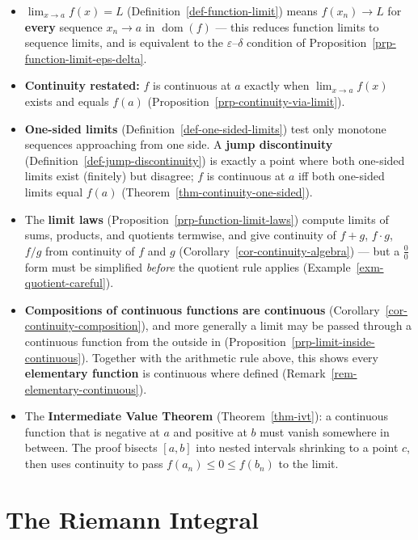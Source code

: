 \documentclass[
  letterpaper,
  DIV=11,
  numbers=noendperiod]{scrreprt}
\providecommand{\tightlist}{%
  \setlength{\itemsep}{0pt}\setlength{\parskip}{0pt}}
\theoremstyle{plain}
\theoremstyle{plain}
\theoremstyle{definition}
\theoremstyle{definition}
\theoremstyle{definition}
\theoremstyle{plain}
\theoremstyle{plain}
\theoremstyle{remark}
\begin{document}
\begin{itemize}
\tightlist
\item
  \(\displaystyle\lim_{x\to a} f(x) = L\)
  (Definition~\ref{def-function-limit}) means \(f(x_n)\to L\) for
  \textbf{every} sequence \(x_n\to a\) in \(\operatorname{dom}(f)\) ---
  this reduces function limits to sequence limits, and is equivalent to
  the \(\varepsilon\)--\(\delta\) condition of
  Proposition~\ref{prp-function-limit-eps-delta}.
\item
  \textbf{Continuity restated:} \(f\) is continuous at \(a\) exactly
  when \(\lim_{x\to a}f(x)\) exists and equals \(f(a)\)
  (Proposition~\ref{prp-continuity-via-limit}).
\item
  \textbf{One-sided limits} (Definition~\ref{def-one-sided-limits}) test
  only monotone sequences approaching from one side. A \textbf{jump
  discontinuity} (Definition~\ref{def-jump-discontinuity}) is exactly a
  point where both one-sided limits exist (finitely) but disagree; \(f\)
  is continuous at \(a\) iff both one-sided limits equal \(f(a)\)
  (Theorem~\ref{thm-continuity-one-sided}).
\item
  The \textbf{limit laws} (Proposition~\ref{prp-function-limit-laws})
  compute limits of sums, products, and quotients termwise, and give
  continuity of \(f+g\), \(f\cdot g\), \(f/g\) from continuity of \(f\)
  and \(g\) (Corollary~\ref{cor-continuity-algebra}) --- but a
  \(\tfrac00\) form must be simplified \emph{before} the quotient rule
  applies (Example~\ref{exm-quotient-careful}).
\item
  \textbf{Compositions of continuous functions are continuous}
  (Corollary~\ref{cor-continuity-composition}), and more generally a
  limit may be passed through a continuous function from the outside in
  (Proposition~\ref{prp-limit-inside-continuous}). Together with the
  arithmetic rule above, this shows every \textbf{elementary function}
  is continuous where defined (Remark~\ref{rem-elementary-continuous}).
\item
  The \textbf{Intermediate Value Theorem} (Theorem~\ref{thm-ivt}): a
  continuous function that is negative at \(a\) and positive at \(b\)
  must vanish somewhere in between. The proof bisects \([a,b]\) into
  nested intervals shrinking to a point \(c\), then uses continuity to
  pass \(f(a_n)\le0\le f(b_n)\) to the limit.
\end{itemize}

\part{The Riemann Integral}
\end{document}

